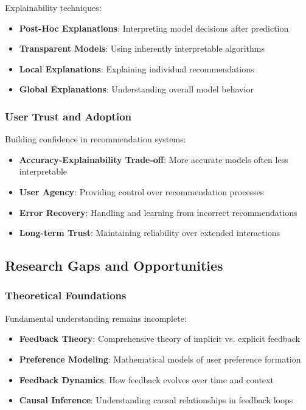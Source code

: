 Explainability techniques:
\begin{itemize}
    \item \textbf{Post-Hoc Explanations}: Interpreting model decisions after prediction
    \item \textbf{Transparent Models}: Using inherently interpretable algorithms
    \item \textbf{Local Explanations}: Explaining individual recommendations
    \item \textbf{Global Explanations}: Understanding overall model behavior
\end{itemize}

\subsubsection{User Trust and Adoption}

Building confidence in recommendation systems:

\begin{itemize}
    \item \textbf{Accuracy-Explainability Trade-off}: More accurate models often less interpretable
    \item \textbf{User Agency}: Providing control over recommendation processes
    \item \textbf{Error Recovery}: Handling and learning from incorrect recommendations
    \item \textbf{Long-term Trust}: Maintaining reliability over extended interactions
\end{itemize}

\subsection{Research Gaps and Opportunities}

\subsubsection{Theoretical Foundations}

Fundamental understanding remains incomplete:

\begin{itemize}
    \item \textbf{Feedback Theory}: Comprehensive theory of implicit vs. explicit feedback
    \item \textbf{Preference Modeling}: Mathematical models of user preference formation
    \item \textbf{Feedback Dynamics}: How feedback evolves over time and context
    \item \textbf{Causal Inference}: Understanding causal relationships in feedback loops
\end{itemize}

